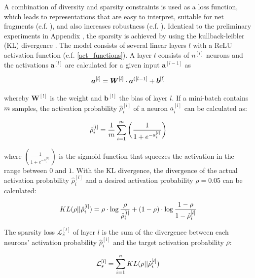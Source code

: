 A combination of diversity and sparsity constraints is used as a loss function, which leads to representations that are easy to interpret, suitable for net fragments (c.f. ), and also increases robustness (c.f. ).
Identical to the preliminary experiments in Appendix , the sparsity is achieved by using the kullback-leibler (KL) divergence .
The model consists of several linear layers $l$ with a ReLU activation function (c.f. \eqref{act_functions}).
A layer $l$ consists of $n^{[l]}$ neurons and the activations $\boldsymbol{a}^{[l]}$ are calculated for a given input $\boldsymbol{a}^{[l-1]}$ as

\begin{align}\eqlbl{vso_1}
		\boldsymbol{a}^{[l]} = \boldsymbol{W}^{[l]} \cdot \boldsymbol{a}^{([l-1]} + \boldsymbol{b}^{[l]}
\end{align}

whereby $\boldsymbol{W}^{[l]}$ is the weight and $\boldsymbol{b}^{[l]}$ the bias of layer $l$.
If a mini-batch contains $m$ samples, the activation probability $\hat{\rho}^{[l]}_i$ of a neuron $a^{[l]}_i$ can be calculated as:

\begin{align}\eqlbl{vso_2}
		\hat{\rho}^{[l]}_i= \frac{1}{m} \sum^m_{i=1} \left( \frac{1}{1+e^{-a^{[l]}_i}} \right)
\end{align}

where $\left( \frac{1}{1+e^{-a^{[l]}_i}} \right)$ is the sigmoid function that squeezes the activation in the range between $0$ and $1$.
With the KL divergence, the divergence of the actual activation probability $\hat{\rho}^{[l]}_i$ and a desired activation probability $\rho=0.05$ can be calculated:

\begin{align}\eqlbl{vso_3}
		KL(\rho || \hat{\rho}^{[l]}_i) = \rho \cdot \log \frac{\rho}{\hat{\rho}^{[l]}_i} + (1-\rho) \cdot \log \frac{1-\rho}{1-\hat{\rho}^{[l]}_i}
\end{align}

The sparsity loss $\mathcal{L}^{[l]}_{s}$ of layer $l$ is the sum of the divergence between each neurons' activation probability $\hat{\rho}^{[l]}_i$ and the target activation probability $\rho$:

\begin{align}\eqlbl{vso_4}
		\mathcal{L}^{[l]}_{s} = \sum_{i=1}^{n} KL(\rho || \hat{\rho}^{[l]}_i)
\end{align}

